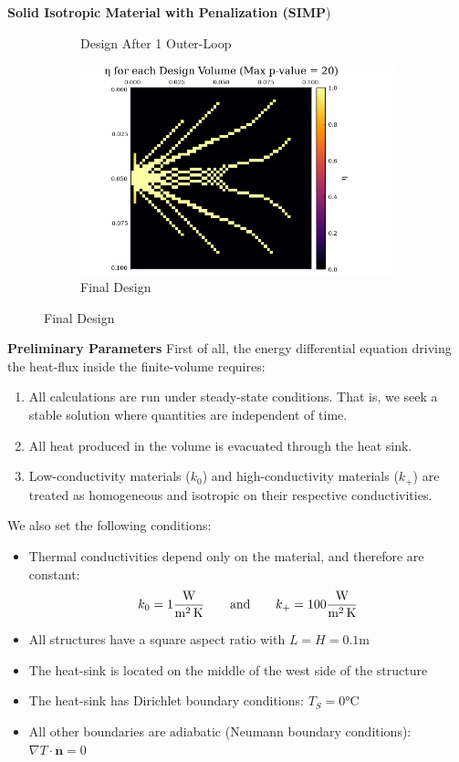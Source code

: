 \documentclass[final]{beamer}
\begin{document}
\begin{frame}{\textbf{Solid Isotropic Material with Penalization (SIMP})}
\begin{figure}
\begin{subfigure}{0.45\linewidth}
			\caption{Design After 1 Outer-Loop}
		\end{subfigure}
		\begin{subfigure}{0.45\linewidth}
			\includegraphics[width=\linewidth]{60x60-Final_Design.png}
			\caption{Final Design}
		\end{subfigure}
	\end{figure}
\end{frame}

{\footnotesize
\begin{frame}[t]{\textbf{Preliminary Parameters}}
	First of all, the energy differential equation driving the heat-flux inside the finite-volume requires:
	\begin{enumerate}
		\item All calculations are run under {\color{tiananmen}steady-state conditions}. That is, we seek a stable solution where quantities are independent of time.
		\item All heat produced in the volume is evacuated through the heat sink.
		\item Low-conductivity materials ($k_0$) and high-conductivity materials ($k_+$) are treated as homogeneous and isotropic on their respective conductivities.
	\end{enumerate}\pause
	We also set the following conditions:
	\begin{itemize}
		\item Thermal conductivities depend only on the material, and therefore are constant:
		$$k_0=1 \si[per-mode=fraction]{\watt\per\square\meter\per\kelvin}\qquad\text{and}\qquad k_+=100 \si[per-mode=fraction]{\watt\per\square\meter\per\kelvin}$$
		\item All structures have a square aspect ratio with $L=H=0.1\si{\meter}$
		\item The heat-sink is located on the middle of the west side of the structure
		\item The heat-sink has {\color{tiananmen}Dirichlet boundary conditions}: $T_S=0\si{\celsius}$
		\item All other boundaries are adiabatic ({\color{tiananmen}Neumann boundary conditions}): $\nabla T\cdot\mathbf{n}=0$
	\end{itemize}
\end{frame}
}
\end{document}

